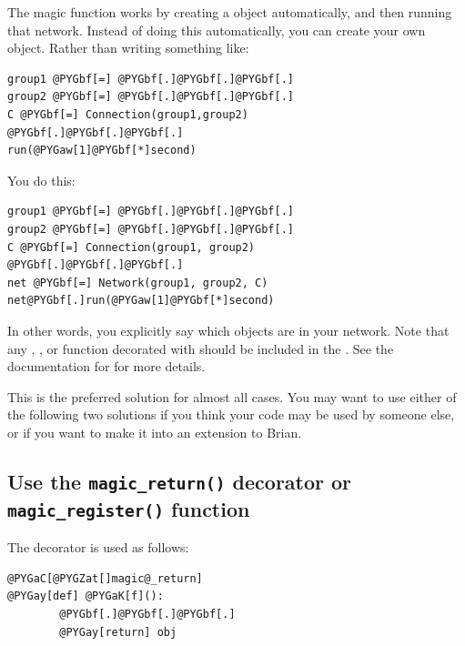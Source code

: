 \documentclass[letterpaper,10pt,english]{manual}
\begin{document}
The magic \hyperlink{brian.run}{} function works by creating a \hyperlink{brian.Network}{}
object automatically, and then running that network. Instead of doing
this automatically, you can create your own \hyperlink{brian.Network}{} object.
Rather than writing something like:

\begin{Verbatim}[commandchars=@\[\]]
group1 @PYGbf[=] @PYGbf[.]@PYGbf[.]@PYGbf[.]
group2 @PYGbf[=] @PYGbf[.]@PYGbf[.]@PYGbf[.]
C @PYGbf[=] Connection(group1,group2)
@PYGbf[.]@PYGbf[.]@PYGbf[.]
run(@PYGaw[1]@PYGbf[*]second)
\end{Verbatim}

You do this:

\begin{Verbatim}[commandchars=@\[\]]
group1 @PYGbf[=] @PYGbf[.]@PYGbf[.]@PYGbf[.]
group2 @PYGbf[=] @PYGbf[.]@PYGbf[.]@PYGbf[.]
C @PYGbf[=] Connection(group1, group2)
@PYGbf[.]@PYGbf[.]@PYGbf[.]
net @PYGbf[=] Network(group1, group2, C)
net@PYGbf[.]run(@PYGaw[1]@PYGbf[*]second)
\end{Verbatim}

In other words, you explicitly say which objects are in your network.
Note that any \hyperlink{brian.NeuronGroup}{}, \hyperlink{brian.Connection}{},  or
function decorated with \hyperlink{brian.network_operation}{} should be included in the
\hyperlink{brian.Network}{}. See the documentation for \hyperlink{brian.Network}{} for more details.

This is the preferred solution for almost all cases. You may want to use either
of the following two solutions if you think your code may be used by someone
else, or if you want to make it into an extension to Brian.

\subsection{Use the \texttt{magic\_return()} decorator or \texttt{magic\_register()} function}

The \hyperlink{brian.magic_return}{} decorator is used as follows:

\begin{Verbatim}[commandchars=@\[\]]
@PYGaC[@PYGZat[]magic@_return]
@PYGay[def] @PYGaK[f]():
        @PYGbf[.]@PYGbf[.]@PYGbf[.]
        @PYGay[return] obj
\end{Verbatim}
\end{document}
